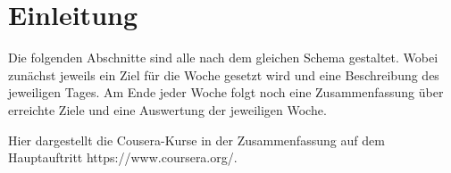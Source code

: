 \documentclass[12pt,a4paper,bibliography=totocnumbered,listof=totocnumbered]{scrartcl}
\begin{document}
\renewcommand{\lstlistlistingname}{Listing-Verzeichnis}
{\lstlistoflistings}
\pagebreak



\renewcommand{\sectionmark}[1]{\markright{#1}}
\renewcommand{\subsectionmark}[1]{}
\renewcommand{\subsubsectionmark}[1]{}
\rhead{\rightmark}

\onehalfspacing
\renewcommand{\thesection}{\arabic{section}}
\renewcommand{\theHsection}{\arabic{section}}
\setcounter{section}{0}
\setcounter{page}{1}

\section{Einleitung}
Die folgenden Abschnitte sind alle nach dem gleichen Schema gestaltet. Wobei zunächst jeweils ein Ziel für die Woche gesetzt wird und eine Beschreibung des jeweiligen Tages. Am Ende jeder Woche folgt noch eine Zusammenfassung über erreichte Ziele und eine Auswertung der jeweiligen Woche. 

Hier dargestellt die Cousera-Kurse in der Zusammenfassung auf dem Hauptauftritt \textcolor[rgb]{0,0,1}{https://www.coursera.org/}.  
\end{document}
